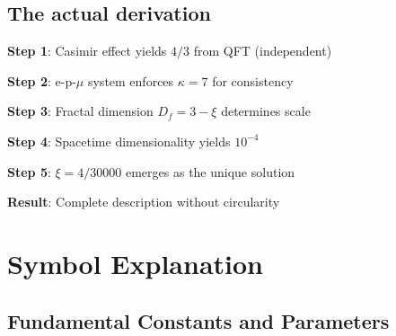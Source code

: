 	\subsection{The actual derivation}
	
	\begin{tcolorbox}[colback=green!5!white,colframe=green!75!black,title={Fundamental Derivation}]
		\textbf{Step 1}: Casimir effect yields $4/3$ from QFT (independent)
		
		\textbf{Step 2}: e-p-$\mu$ system enforces $\kappa = 7$ for consistency
		
		\textbf{Step 3}: Fractal dimension $D_f = 3 - \xi$ determines scale
		
		\textbf{Step 4}: Spacetime dimensionality yields $10^{-4}$
		
		\textbf{Step 5}: $\xi = 4/30000$ emerges as the unique solution
		
		\textbf{Result}: Complete description without circularity
	\end{tcolorbox}
	
\section{Symbol Explanation}
	
	\subsection{Fundamental Constants and Parameters}
	
	\begin{table}[htbp]
		\centering
		\caption{Fundamental parameters of T0 Theory}
	\end{table}
	
